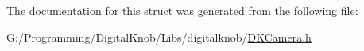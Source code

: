 The documentation for this struct was generated from the following file\-:\begin{DoxyCompactItemize}
\item 
G\-:/\-Programming/\-Digital\-Knob/\-Libs/digitalknob/\hyperlink{_d_k_camera_8h}{D\-K\-Camera.\-h}\end{DoxyCompactItemize}
